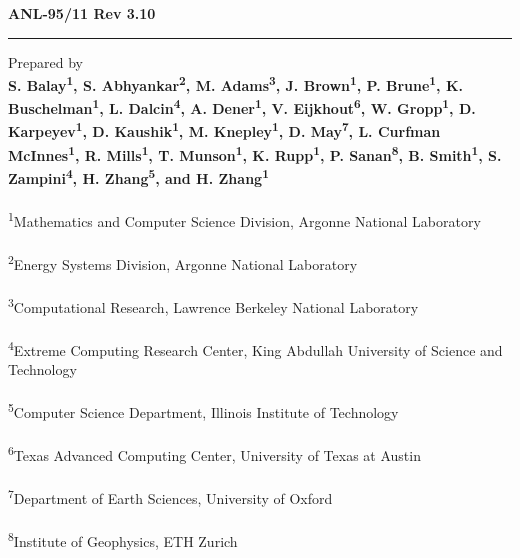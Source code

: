 \pagestyle{empty}
\hfill {\large {\bf ANL-95/11 Rev 3.10}}

\vspace*{2in}
\vspace*{8pt}
\hrule
\vspace*{8pt}

\vspace*{0.5in}
\noindent Prepared by \\
{\bf S. Balay\textsuperscript{1}, S. Abhyankar\textsuperscript{2}, M. Adams\textsuperscript{3}, J. Brown\textsuperscript{1}, P. Brune\textsuperscript{1}, K. Buschelman\textsuperscript{1},
L. Dalcin\textsuperscript{4}, A. Dener\textsuperscript{1}, V. Eijkhout\textsuperscript{6}, W. Gropp\textsuperscript{1}, D. Karpeyev\textsuperscript{1},
D. Kaushik\textsuperscript{1}, M. Knepley\textsuperscript{1}, D. May\textsuperscript{7}, L. Curfman McInnes\textsuperscript{1}, R. Mills\textsuperscript{1}, T. Munson\textsuperscript{1},
K. Rupp\textsuperscript{1}, P. Sanan\textsuperscript{8}, B. Smith\textsuperscript{1}, S. Zampini\textsuperscript{4}, H. Zhang\textsuperscript{5}, and H. Zhang\textsuperscript{1}}\\
\\
\textsuperscript{1}Mathematics and Computer Science Division, Argonne National Laboratory \\
\\
\textsuperscript{2}Energy Systems Division, Argonne National Laboratory \\
\\
\textsuperscript{3}Computational Research, Lawrence Berkeley National Laboratory \\
\\
\textsuperscript{4}Extreme Computing Research Center, King Abdullah University of Science and Technology\\
\\
\textsuperscript{5}Computer Science Department, Illinois Institute of Technology\\
\\
\textsuperscript{6}Texas Advanced Computing Center, University of Texas at Austin\\
\\
\textsuperscript{7}Department of Earth Sciences, University of Oxford\\
\\
\textsuperscript{8}Institute of Geophysics, ETH Zurich\\


